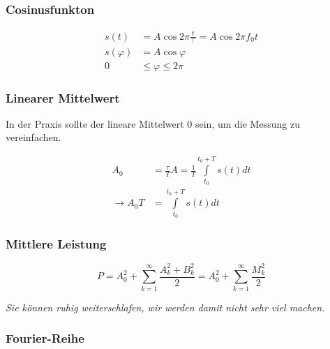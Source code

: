 \begin{multicols}{2}
\subsubsection{Cosinusfunkton}

	\begin{align*}
		s(t) &= A \cos{2 \pi \frac{t}{\top}} = A \cos{2 \pi f_0 t} \\
		s(\varphi) &= A \cos{\varphi} \\
		0 &\leq \varphi \le 2 \pi
	\end{align*}
	
	\noindent{}

	

\subsubsection{Linearer Mittelwert}

	In der Praxis sollte der lineare Mittelwert 0 sein, um die Messung zu vereinfachen.

	\begin{align*}
		A_0 &= \frac{\tau}{T} A = \frac{1}{T} \int\limits_{t_0}^{t_0 + T}{s(t) dt} \\
		\to A_0 T &=  \int\limits_{t_0}^{t_0 + T}{s(t) dt}
	\end{align*}
	
\subsubsection{Mittlere Leistung}

\[
P = A_0^2 + \sum^{\infty}_{k=1}{
		\frac{A_k^2 + B_k^2}{2}
	} = A_0^2 + \sum^{\infty}_{k=1}{\frac{M_k^2}{2}}
\]

\emph{Sie können ruhig weiterschlafen, wir werden damit nicht sehr viel machen.}

\subsubsection{Fourier-Reihe}


\end{multicols}
